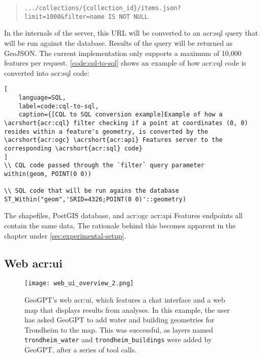\begin{quote}
    \texttt{.../collections/\{collection\_id\}/items.json?limit=1000\&filter=name IS NOT NULL}
\end{quote}

In the internals of the server, this URL will be converted to an \acrshort{acr:sql} query that will be run against the database. Results of the query will be returned as GeoJSON. The current implementation only supports a maximum of 10,000 features per request. \autoref{code:cql-to-sql} shows an example of how \acrshort{acr:cql} code is converted into \acrshort{acr:sql} code:

\begin{lstlisting}[
    language=SQL,
    label=code:cql-to-sql,
    caption={[CQL to SQL conversion example]Example of how a \acrshort{acr:cql} filter checking if a point at coordinates (0, 0) resides within a feature's geometry, is converted by the \acrshort{acr:ogc} \acrshort{acr:api} Features server to the corresponding \acrshort{acr:sql} code} 
]
\\ CQL code passed through the `filter` query parameter
within(geom, POINT(0 0))

\\ SQL code that will be run agains the database
ST_Within("geom",'SRID=4326;POINT(0 0)'::geometry)
\end{lstlisting}

The shapefiles, PostGIS database, and \acrshort{acr:ogc} \acrshort{acr:api} Features endpoints all contain the same data. The rationale behind this becomes apparent in the  chapter under \autoref{sec:experimental-setup}.

\subsection[Web UI]{Web \acrshort{acr:ui}}
\label{subsec:web-ui}

\begin{figure}[h]
    \centering
    \texttt{[image: web\_ui\_overview\_2.png]}
    \caption[GeoGPT's web UI]{GeoGPT's web \acrshort{acr:ui}, which features a chat interface and a web map that displays results from analyses. In this example, the user has asked GeoGPT to add water and building geometries for Trondheim to the map. This was successful, as layers named \texttt{trondheim\_water} and \texttt{trondheim\_buildings} were added by GeoGPT, after a series of tool calls.}
    \label{fig:web-ui}
\end{figure}


